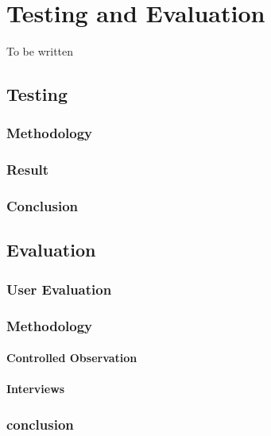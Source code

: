 
\chapter{Testing and Evaluation} %

\label{Chapter6} %


To be written

\section{Testing}
\subsection{Methodology}
\subsection{Result}
\subsection{Conclusion}
\section{Evaluation}
\subsection{User Evaluation}
\subsection{Methodology}
\subsubsection{Controlled Observation}
\subsubsection{Interviews}
\subsection{conclusion}
